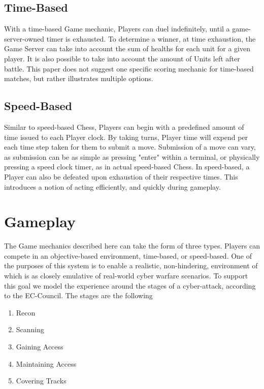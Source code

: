 \documentclass[10pt, titlepage, twocolumn]{article}
\newcommand{\ii}{\indent\indent}
\begin{document}
\subsection{Time-Based}
\ii
With a time-based Game mechanic, Players can duel indefinitely, until a game-server-owned timer is exhausted. To determine a winner, at time exhaustion, the Game Server can take into account the sum of healths for each unit for a given player. It is also possible to take into account the amount of Units left after battle. This paper does not suggest one specific scoring mechanic for time-based matches, but rather illustrates multiple options.

\subsection{Speed-Based}
\ii
Similar to speed-based Chess, Players can begin with a predefined amount of time issued to each Player clock. By taking turns, Player time will expend per each time step taken for them to submit a move. Submission of a move can vary, as submission can be as simple as pressing "enter" within a terminal, or physically pressing a speed clock timer, as in actual speed-based Chess. In speed-based, a Player can also be defeated upon exhaustion of their respective times. This introduces a notion of acting efficiently, and quickly during gameplay.





\section{Gameplay}
The Game mechanics described here can take the form of three types. Players can compete in an objective-based environment, time-based, or speed-based. One of the purposes of this system is to enable a realistic, non-hindering, environment of which is as closely emulative of real-world cyber warfare scenarios. To support this goal we model the experience around the stages of a cyber-attack, according to the EC-Council. The stages are the following

\begin{enumerate}
	\item Recon
	\item Scanning
	\item Gaining Access
	\item Maintaining Access
	\item Covering Tracks
\end{enumerate}
\end{document}
